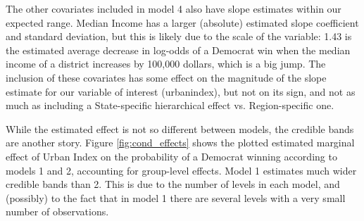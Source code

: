 \documentclass[12pt]{article}
\begin{document}
The other covariates included in model 4 also have slope estimates within our expected range.
Median Income has a larger (absolute) estimated slope coefficient and standard deviation, but this is likely due to the scale of the variable: 1.43 is the estimated average decrease in log-odds of a Democrat win when the median income of a district increases by 100,000 dollars, which is a big jump. The inclusion of these covariates has some effect on the magnitude of the slope estimate for our variable of interest (urbanindex), but not on its sign, and not as much as including a State-specific hierarchical effect vs. Region-specific one.




While the estimated effect is not so different between models, the credible bands are another story. Figure \ref{fig:cond_effects} shows the plotted estimated marginal effect of Urban Index on the probability of a Democrat winning according to models 1 and 2, accounting for group-level effects. Model 1 estimates much wider credible bands than 2. This is due to the number of levels in each model, and (possibly) to the fact that in model 1 there are several levels with a very small number of observations.
\end{document}
